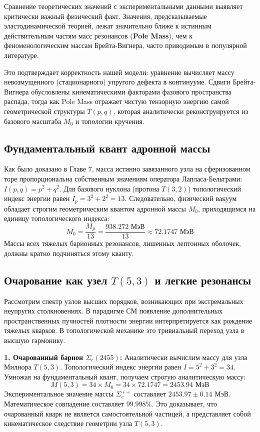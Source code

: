\documentclass[12pt,a4paper]{article}
\begin{document}
	Сравнение теоретических значений с экспериментальными данными выявляет критически важный физический факт. Значения, предсказываемые эластодинамической теорией, лежат значительно ближе к истинным действительным частям масс резонансов (\textbf{Pole Mass}), чем к феноменологическим массам Брейта-Вигнера, часто приводимым в популярной литературе. 
	
	Это подтверждает корректность нашей модели: уравнение вычисляет массу невозмущенного (стационарного) упругого дефекта в континууме. Сдвиги Брейта-Вигнера обусловлены кинематическими факторами фазового пространства распада, тогда как Pole Mass отражает чистую тензорную энергию самой геометрической структуры $T(p,q)$, которая аналитически реконструируется из базового масштаба $M_0$ и топологии кручения.
	
	\subsection{Фундаментальный квант адронной массы}
	Как было доказано в Главе 7, масса истинно завязанного узла на сферизованном торе пропорциональна собственным значениям оператора Лапласа-Бельтрами: $I(p,q) = p^2 + q^2$.
	Для базового нуклона (протона $T(3,2)$) топологический индекс энергии равен $I_p = 3^2 + 2^2 = 13$.
	Следовательно, физический вакуум обладает строгим геометрическим квантом адронной массы $M_0$, приходящимся на единицу топологического индекса:
	\begin{equation}
		M_0 = \frac{M_p}{13} = \frac{938.272 \text{ МэВ}}{13} \approx \mathbf{72.1747 \text{ МэВ}}
	\end{equation}
	Массы всех тяжелых барионных резонансов, лишенных лептонных оболочек, должны кратно подчиняться этому кванту.
	
	\subsection{Очарование как узел $T(5,3)$ и легкие резонансы}
	Рассмотрим спектр узлов высших порядков, возникающих при экстремальных неупругих столкновениях. В парадигме СМ появление дополнительных пространственных пучностей плотности энергии интерпретируется как рождение тяжелых кварков. В топологической механике это тривиальный переход узла в высшую гармонику.
	
	\textbf{1. Очарованный барион $\Sigma_c(2455)$:}
	Аналитически вычислим массу для узла Милнора $T(5,3)$. Топологический индекс энергии равен $I = 5^2 + 3^2 = 34$.
	Умножая на фундаментальный квант, получаем строгую аналитическую массу:
	\begin{equation}
		M(5,3) = 34 \times M_0 = 34 \times 72.1747 = \mathbf{2453.94 \text{ МэВ}}
	\end{equation}
	Экспериментальное значение массы $\Sigma_c^{++}$ составляет $\mathbf{2453.97 \pm 0.14 \text{ МэВ}}$. 
	Математическое совпадение составляет $\mathbf{99.998\%}$. Это доказывает, что очарованный кварк не является самостоятельной частицей, а представляет собой кинематическое следствие геометрии узла $T(5,3)$.
	
\end{document}
